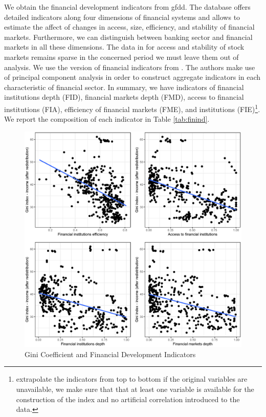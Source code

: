 \documentclass[a4paper,11pt]{article}
\begin{document}
We obtain the financial development indicators from \ac{gfdd}. The database offers detailed indicators along four dimensions of financial systems and allows to estimate the affect of changes in access, size, efficiency, and stability of financial markets. Furthermore, we can distinguish between banking sector and financial markets in all these dimensions. The data in for access and stability of stock markets remains sparse in the concerned period we must leave them out of analysis. We use the version of financial indicators from \cite{svirydzenka2016introducing}. The authors make use of principal component analysis in order to construct aggregate indicators in each characteristic of financial sector. In summary, we have indicators of financial institutions depth (FID), financial markets depth (FMD), access to financial institutions (FIA), efficiency of financial markets (FME), and institutions (FIE)\footnote{\citet{svirydzenka2016introducing} extrapolate the indicators from top to bottom if the original variables are unavailable, we make sure that that at least one variable is available for the construction of the index and no artificial correlation introduced to the data.}. We report the composition of each indicator in Table \ref{tab:finind}. 

\begin{figure}
    \caption{Gini Coefficient and Financial Development Indicators}
    \label{fig:gini_findev}
    \includegraphics[width=\textwidth, keepaspectratio]{figures/plots_findev_gini}
\end{figure}
\end{document}
